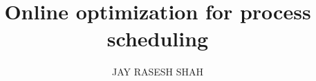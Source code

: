 \documentclass[a4paper,12pt,twoside,openany,Seminar,chapterbib]{CMU} %
\title{Online optimization for process scheduling}
\author{{JAY RASESH SHAH}}
\begin{document}
 


\frontmatter
\tableofcontents

\listoffigures
\begingroup
\let\clearpage\relax
\vspace{3em}
\listoftables
\endgroup

\mainmatter








%
%
\backmatter
\def\nomname{Abbreviations}
\printnomenclature[3cm]
\newpage

\setlength{\bibhang}{7mm}


\end{document}
